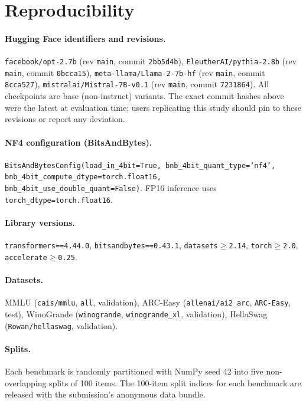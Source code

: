 \documentclass{article}
\begin{document}
\appendix
\onecolumn

\section{Reproducibility}
\label{sec:reproducibility}

\paragraph{Hugging Face identifiers and revisions.}
\texttt{facebook/opt-2.7b} (rev \texttt{main}, commit \texttt{2bb5d4b}), \texttt{EleutherAI/pythia-2.8b} (rev \texttt{main}, commit \texttt{0bcca15}), \texttt{meta-llama/Llama-2-7b-hf} (rev \texttt{main}, commit \texttt{8cca527}), \texttt{mistralai/Mistral-7B-v0.1} (rev \texttt{main}, commit \texttt{7231864}). All checkpoints are base (non-instruct) variants. The exact commit hashes above were the latest at evaluation time; users replicating this study should pin to these revisions or report any deviation.

\paragraph{NF4 configuration (BitsAndBytes).}
\texttt{BitsAndBytesConfig(load\_in\_4bit=True, bnb\_4bit\_quant\_type=`nf4', bnb\_4bit\_compute\_dtype=torch.float16, bnb\_4bit\_use\_double\_quant=False)}. FP16 inference uses \texttt{torch\_dtype=torch.float16}.

\paragraph{Library versions.}
\texttt{transformers==4.44.0}, \texttt{bitsandbytes==0.43.1}, \texttt{datasets$\ge$2.14}, \texttt{torch$\ge$2.0}, \texttt{accelerate$\ge$0.25}.

\paragraph{Datasets.}
MMLU (\texttt{cais/mmlu}, \texttt{all}, validation), ARC-Easy (\texttt{allenai/ai2\_arc}, \texttt{ARC-Easy}, test), WinoGrande (\texttt{winogrande}, \texttt{winogrande\_xl}, validation), HellaSwag (\texttt{Rowan/hellaswag}, validation).

\paragraph{Splits.}
Each benchmark is randomly partitioned with NumPy seed 42 into five non-overlapping splits of 100 items. The 100-item split indices for each benchmark are released with the submission's anonymous data bundle.
\end{document}
